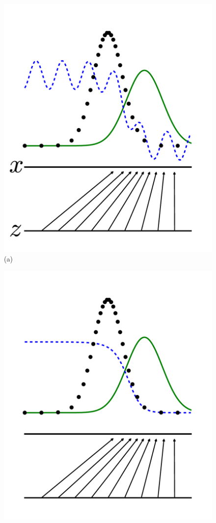 \begin{figure}[p] 
  \begin{minipage}[b]{0.5\linewidth}
    \centering
    \includegraphics[width=.9\linewidth]{figures/fig1.pdf} \\ 
    (a)
    \vspace{4ex}
  \end{minipage}%
  \begin{minipage}[b]{0.5\linewidth}
    \centering
    \includegraphics[width=.9\linewidth]{figures/fig2.pdf} \\

\end{minipage}
\end{figure}
